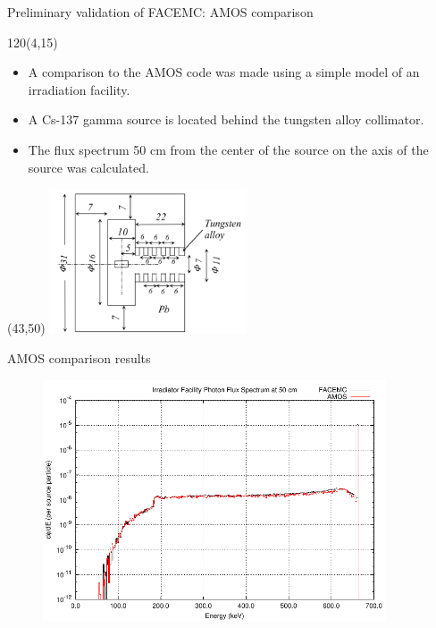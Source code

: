 \documentclass{beamer}
\begin{document}
\begin{frame}{Preliminary validation of FACEMC: AMOS comparison}

   \begin{textblock}{120}(4,15)
    \begin{itemize}
      \item A comparison to the AMOS code was made using a simple model
        of an irradiation facility.
      \item A Cs-137 gamma source is located behind the tungsten alloy 
        collimator.
      \item The flux spectrum 50 cm from the center of the source on the
        axis of the source was calculated.
    \end{itemize}
  \end{textblock}

  \begin{textblock}{20}(43,50)
    \includegraphics[width=2.3in]{figures/Irradiator_Facility.png}
  \end{textblock}

\end{frame}

\begin{frame}{AMOS comparison results}

  \begin{figure}[h!]
    \begin{center}
      \includegraphics[width=4in]{figures/facemc_amos_irradiator_comp.pdf}
    \end{center}
  \end{figure}

\end{frame}
\end{document}
